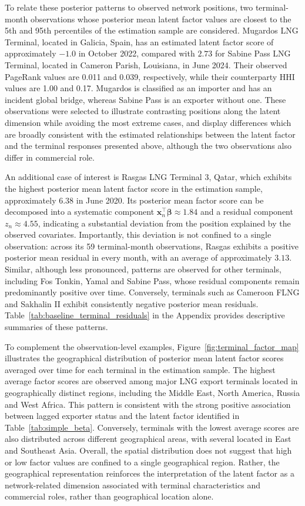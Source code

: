 \documentclass[pdftex,12pt,openright,a4paper,oneside]{book}
\begin{document}
To relate these posterior patterns to observed network positions, two terminal-month observations whose
posterior mean latent factor values are closest to the 5th and 95th percentiles of the estimation sample are 
considered. 
Mugardos LNG Terminal, located in Galicia, Spain, has an estimated latent factor score of approximately $-1.0$ in October 2022, 
compared with $2.73$ for Sabine Pass LNG Terminal, located in Cameron Parish, Louisiana, in June 2024. 
Their observed PageRank values are 0.011 and 0.039, respectively, while their counterparty HHI values are 1.00 and 0.17. 
Mugardos is classified as an importer and has an incident global bridge, whereas Sabine Pass is an exporter without one. 
These observations were selected to illustrate contrasting positions along the latent dimension 
while avoiding the most extreme cases, and display differences which are broadly consistent with the estimated relationships between the latent factor and the terminal 
responses presented above, although the two observations also differ in commercial role.

An additional case of interest is Rasgas LNG Terminal 3, Qatar, which exhibits the highest posterior mean latent factor 
score in the estimation sample, approximately $6.38$ in June 2020. Its posterior mean factor score can be decomposed into a systematic 
component $\mathbf{x}_n^\top\boldsymbol{\beta}\approx 1.84$
and a residual component $z_n\approx 4.55$, indicating a substantial deviation from the 
position explained by the observed covariates. 
Importantly, this deviation is not confined to a single observation: across its 59 terminal-month observations, Rasgas exhibits a positive posterior 
mean residual in every month, with an average of approximately $3.13$. Similar, although less pronounced, patterns are 
observed for other terminals, including Fos Tonkin, Yamal and Sabine Pass, whose residual components remain predominantly 
positive over time. Conversely, terminals such as Cameroon FLNG and Sakhalin II exhibit consistently negative posterior 
mean residuals. Table~\ref{tab:baseline_terminal_residuals} in the Appendix provides descriptive summaries of these 
patterns. 

To complement the observation-level examples, Figure~\ref{fig:terminal_factor_map} illustrates the geographical distribution 
of posterior mean latent factor scores averaged over time for each terminal in the estimation sample. 
The highest average factor scores are observed among major LNG export terminals located in geographically distinct regions, 
including the Middle East, North America, Russia and West Africa. This pattern is consistent with the strong positive association 
between lagged exporter status and the latent factor identified in Table~\ref{tab:simple_beta}. Conversely, terminals with the 
lowest average scores are also distributed across different geographical areas, with several located in East and Southeast Asia. 
Overall, the spatial distribution does not suggest that high or low factor values are confined to a single geographical region. 
Rather, the geographical representation reinforces the interpretation of the latent factor as a network-related dimension associated 
with terminal characteristics and commercial roles, rather than geographical location alone.
\end{document}
